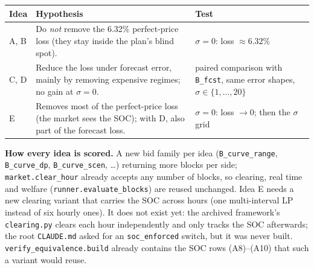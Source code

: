 \documentclass[10pt,a4paper]{article}
\newcommand{\code}[1]{\texttt{#1}}
\begin{document}
\begin{center}\small
\begin{tabularx}{\textwidth}{@{}l>{\raggedright\arraybackslash}X>{\raggedright\arraybackslash}p{4.6cm}@{}}
\toprule
Idea & Hypothesis & Test \\
\midrule
A, B & Do \emph{not} remove the 6.32\% perfect-price loss (they stay inside the plan's blind spot). & $\sigma=0$: loss $\approx6.32\%$ \\
C, D & Reduce the loss under forecast error, mainly by removing expensive regimes; no gain at $\sigma=0$. & paired comparison with \code{B\_fcst}, same error shapes, $\sigma\in\{1,\dots,20\}$ \\
E & Removes most of the perfect-price loss (the market sees the SOC); with D, also part of the forecast loss. & $\sigma=0$: loss $\to0$; then the $\sigma$ grid \\
\bottomrule
\end{tabularx}
\end{center}

\textbf{How every idea is scored.} A new bid family per idea (\code{B\_curve\_range}, \code{B\_curve\_dp},
\code{B\_curve\_scen}, \dots) returning more blocks per side; \code{market.clear\_hour} already accepts any number
of blocks, so clearing, real time and welfare (\code{runner.evaluate\_blocks}) are reused unchanged. Idea E needs
a new clearing variant that carries the SOC across hours (one multi-interval LP instead of six hourly ones).
It does not exist yet: the archived framework's \code{clearing.py} clears each hour independently and only
tracks the SOC afterwards; the root \code{CLAUDE.md} asked for an \code{soc\_enforced} switch, but it was never
built. \code{verify\_equivalence.build} already contains the SOC rows (A8)--(A10) that such a variant would reuse.

\begin{center}
\end{center}
\end{document}
